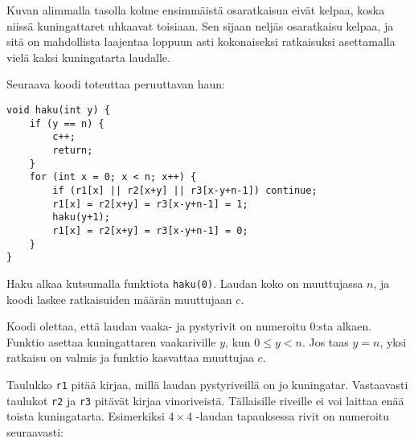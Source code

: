 Kuvan alimmalla tasolla kolme ensimmäistä osaratkaisua
eivät kelpaa, koska niissä kuningattaret uhkaavat
toisiaan.
Sen sijaan neljäs osaratkaisu kelpaa,
ja sitä on mahdollista laajentaa loppuun asti
kokonaiseksi ratkaisuksi
asettamalla vielä kaksi kuningatarta laudalle.

\begin{samepage}
Seuraava koodi toteuttaa peruuttavan haun:

\begin{lstlisting}
void haku(int y) {
    if (y == n) {
        c++;
        return;
    }
    for (int x = 0; x < n; x++) {
        if (r1[x] || r2[x+y] || r3[x-y+n-1]) continue;
        r1[x] = r2[x+y] = r3[x-y+n-1] = 1;
        haku(y+1);
        r1[x] = r2[x+y] = r3[x-y+n-1] = 0;
    }
}
\end{lstlisting}
\end{samepage}
Haku alkaa kutsumalla funktiota \texttt{haku(0)}.
Laudan koko on muuttujassa $n$,
ja koodi laskee ratkaisuiden määrän
muuttujaan $c$.

Koodi olettaa, että laudan vaaka- ja pystyrivit
on numeroitu 0:sta alkaen.
Funktio asettaa kuningattaren vaakariville $y$,
kun $0 \le y < n$.
Jos taas $y=n$, yksi ratkaisu on valmis
ja funktio kasvattaa muuttujaa $c$.

Taulukko \texttt{r1} pitää kirjaa,
millä laudan pystyriveillä on jo kuningatar.
Vastaavasti taulukot \texttt{r2} ja \texttt{r3}
pitävät kirjaa vinoriveistä.
Tällaisille riveille ei voi laittaa enää toista
kuningatarta.
Esimerkiksi $4 \times 4$ -laudan tapauksessa
rivit on numeroitu seuraavasti:

